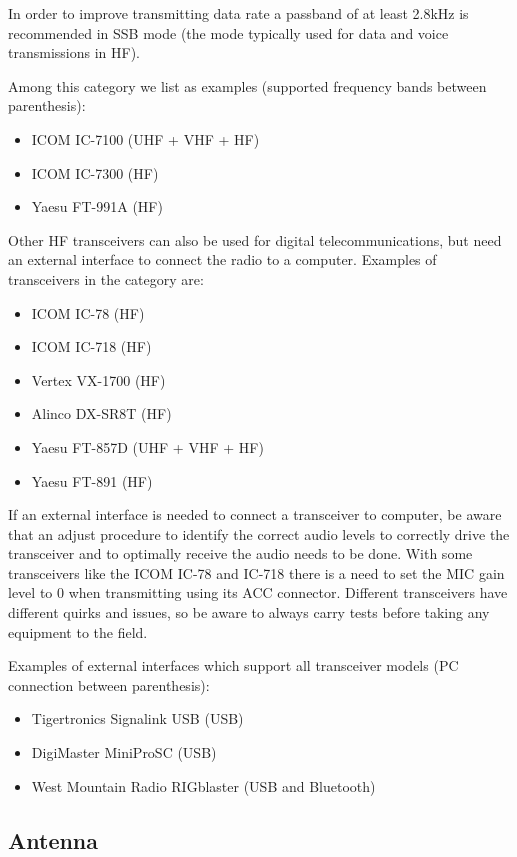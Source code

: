 \documentclass[11pt,a4paper]{article}
\begin{document}
In order to improve transmitting data rate a passband of at least 2.8kHz is
recommended in SSB mode (the mode typically used for data and voice
transmissions in HF).

Among this category we list as examples (supported frequency bands between parenthesis):

\begin{itemize}
\item ICOM IC-7100 (UHF + VHF + HF)
\item ICOM IC-7300 (HF)
\item Yaesu FT-991A (HF)
\end{itemize}

Other HF transceivers can also be used for digital telecommunications, but
need an external interface to connect the radio to a computer. Examples
of transceivers in the category are:

\begin{itemize}
\item ICOM IC-78 (HF)
\item ICOM IC-718 (HF)
\item Vertex VX-1700 (HF)
\item Alinco DX-SR8T (HF)
\item Yaesu FT-857D (UHF + VHF + HF)
\item Yaesu FT-891 (HF)
\end{itemize}

If an external interface is needed to connect a transceiver to computer, be
aware that an adjust procedure to identify the correct audio levels to
correctly drive the transceiver and to optimally receive the audio needs to
be done. With some transceivers like the ICOM IC-78 and IC-718 there is a
need to set the MIC gain level to 0 when transmitting using its ACC
connector. Different transceivers have different quirks and issues, so be
aware to always carry tests before taking any equipment to the field.

Examples of external interfaces which support all transceiver
models (PC connection between parenthesis):
\begin{itemize}
\item Tigertronics Signalink USB (USB)
\item DigiMaster MiniProSC (USB)
\item West Mountain Radio RIGblaster (USB and Bluetooth)
\end{itemize}

\subsection{Antenna}
\end{document}

